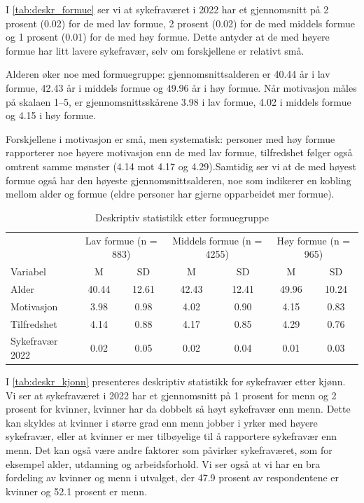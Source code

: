 \documentclass[
  12pt,
  a4paper,
  DIV=11,
  numbers=noendperiod]{scrartcl}
\begin{document}
I \autoref{tab:deskr_formue} ser vi at sykefraværet i 2022 har et
gjennomsnitt på 2 prosent (0.02) for de med lav formue, 2 prosent (0.02)
for de med middels formue og 1 prosent (0.01) for de med høy formue.
Dette antyder at de med høyere formue har litt lavere sykefravær, selv
om forskjellene er relativt små.

Alderen øker noe med formuegruppe: gjennomsnittsalderen er 40.44 år i
lav formue, 42.43 år i middels formue og 49.96 år i høy formue. Når
motivasjon måles på skalaen 1--5, er gjennomsnittsskårene 3.98 i lav
formue, 4.02 i middels formue og 4.15 i høy formue.

Forskjellene i motivasjon er små, men systematisk: personer med høy
formue rapporterer noe høyere motivasjon enn de med lav formue,
tilfredshet følger også omtrent samme mønster (4.14 mot 4.17 og
4.29).Samtidig ser vi at de med høyest formue også har den høyeste
gjennomsnittsalderen, noe som indikerer en kobling mellom alder og
formue (eldre personer har gjerne opparbeidet mer formue).

\begin{table}[H]
\centering
\begin{tabular}{lcccccc}
\toprule
                        & \multicolumn{2}{c}{Lav formue (n = 883)} 
                        & \multicolumn{2}{c}{Middels formue (n = 4255)} 
                        & \multicolumn{2}{c}{Høy formue (n = 965)}         \\
\cmidrule(r){2-3}\cmidrule(lr){4-5}\cmidrule(l){6-7}
Variabel                & M      & SD     & M       & SD     & M      & SD    \\
\midrule
Alder                   & 40.44  & 12.61  & 42.43   & 12.41  & 49.96  & 10.24 \\
Motivasjon              &  3.98  &  0.98  &  4.02   &  0.90  &  4.15  &  0.83 \\
Tilfredshet             &  4.14  &  0.88  &  4.17   &  0.85  &  4.29  &  0.76 \\
Sykefravær 2022         &  0.02  &  0.05  &  0.02   &  0.04  &  0.01  &  0.03 \\
\bottomrule
\end{tabular}
\caption{Deskriptiv statistikk etter formuegruppe}
\label{tab:deskr_formue}
\end{table}

I \autoref{tab:deskr_kjonn} presenteres deskriptiv statistikk for
sykefravær etter kjønn. Vi ser at sykefraværet i 2022 har et
gjennomsnitt på 1 prosent for menn og 2 prosent for kvinner, kvinner har
da dobbelt så høyt sykefravær enn menn. Dette kan skyldes at kvinner i
større grad enn menn jobber i yrker med høyere sykefravær, eller at
kvinner er mer tilbøyelige til å rapportere sykefravær enn menn. Det kan
også være andre faktorer som påvirker sykefraværet, som for eksempel
alder, utdanning og arbeidsforhold. Vi ser også at vi har en bra
fordeling av kvinner og menn i utvalget, der 47.9 prosent av
respondentene er kvinner og 52.1 prosent er menn.
\end{document}
